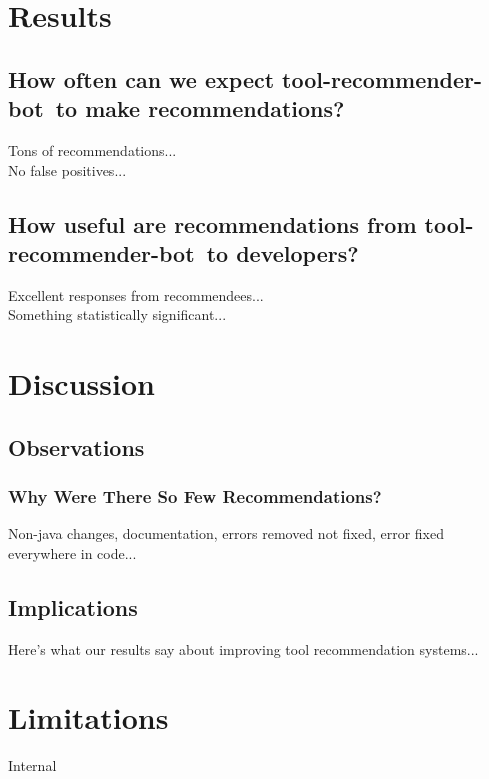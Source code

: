 \documentclass[conference]{IEEEtran}
\newcommand{\tool}{tool-recommender-bot}
\begin{document}
\section{Results}

\subsection{How often can we expect \tool~to make recommendations?}

Tons of recommendations... \\

No false positives...

\subsection{How useful are recommendations from \tool~to developers?}

Excellent responses from recommendees...\\

Something statistically significant...

\section{Discussion}

\subsection{Observations}

\subsubsection{Why Were There So Few Recommendations?}

Non-java changes, documentation, errors removed not fixed, error fixed everywhere in code...

\subsection{Implications}

Here's what our results say about improving tool recommendation systems...

\section{Limitations}

Internal\\
\end{document}
